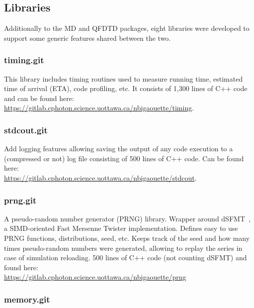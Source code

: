 \subsection{Libraries}
\label{section:tools:libraries}

Additionally to the MD and QFDTD packages, eight libraries were developed to
support some generic features shared between the two.

\subsubsection{timing.git} \label{section:tools:libraries:timing}

This library includes timing routines used to measure running time, estimated
time of arrival (ETA), code profiling, etc. It consists of 1,300 lines of C++
code and can be found here:
\url{https://gitlab.cphoton.science.uottawa.ca/nbigaouette/timing}.


\subsubsection{stdcout.git} \label{section:tools:libraries:stdcout}

Add logging features allowing saving the output of any code execution to a
(compressed or not) log file consisting of 500 lines of C++ code.
Can be found here:\\
\url{https://gitlab.cphoton.science.uottawa.ca/nbigaouette/stdcout}.


\subsubsection{prng.git} \label{section:tools:libraries:prng}

A pseudo-random number generator (PRNG) library. Wrapper around
dSFMT~\cite{prng2009}, a SIMD-oriented Fast Mersenne Twister implementation.
Defines easy to use PRNG functions, distributions, seed, etc. Keeps track of
the seed and how many times pseudo-random numbers were generated, allowing
to replay the series in case of simulation reloading. 500 lines of C++ code
(not counting dSFMT) and found here:\\
\url{https://gitlab.cphoton.science.uottawa.ca/nbigaouette/prng}


\subsubsection{memory.git} \label{section:tools:libraries:memory}

